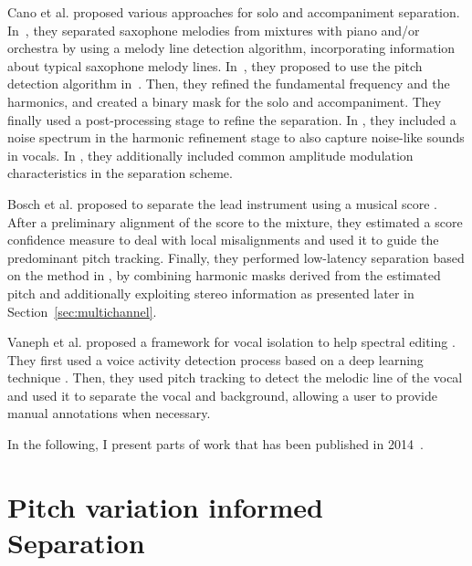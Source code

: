 Cano et al. proposed various approaches for solo and accompaniment separation. In~\cite{cano09}, they separated saxophone melodies from mixtures with piano and/or orchestra by using a melody line detection algorithm, incorporating information about typical saxophone melody lines. In~\cite{grollmisch11,dittmar12,cano12}, they proposed to use the pitch detection algorithm in~\cite{dressler11}. Then, they refined the fundamental frequency and the harmonics, and created a binary mask for the solo and accompaniment. They finally used a post-processing stage to refine the separation. In \cite{cano13}, they included a noise spectrum in the harmonic refinement stage to also capture noise-like sounds in vocals. In \cite{cano14}, they additionally included common amplitude modulation characteristics in the separation scheme.

Bosch et al. proposed to separate the lead instrument using a musical score \cite{bosch12}. After a preliminary alignment of the score to the mixture, they estimated a score confidence measure to deal with local misalignments and used it to guide the predominant pitch tracking. Finally, they performed low-latency separation based on the method in \cite{marxer12}, by combining harmonic masks derived from the estimated pitch and additionally exploiting stereo information as presented later in Section~\ref{sec:multichannel}.

Vaneph et al. proposed a framework for vocal isolation to help spectral editing \cite{vaneph16}. They first used a voice activity detection process based on a deep learning technique \cite{leglaive15}. Then, they used pitch tracking to detect the melodic line of the vocal and used it to separate the vocal and background, allowing a user to provide manual annotations when necessary.
\par
In the following, I present parts of work that has been published in 2014~\cite{stoeter14}.

\section{Pitch variation informed Separation}
\label{sub:frequency_modulation}



